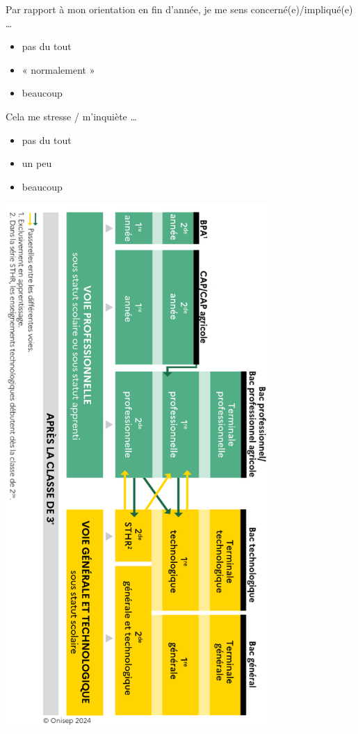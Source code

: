\documentclass[11pt,a5paper]{article}
\begin{document}
\vspace{1.2em}
Par rapport à mon orientation en fin d'année, je me sens concerné(e)/impliqué(e) …
\begin{itemize}[label=\square, topsep=0pt]
\item pas du tout
\item « normalement »
\item beaucoup
\end{itemize}


\vspace{1.2em}
Cela me stresse / m'inquiète …
\begin{itemize}[label=\square, topsep=0pt]
\item pas du tout
\item un peu
\item beaucoup
\end{itemize}

\newpage
\begin{center}
\includegraphics[width=0.75\textwidth]{images/orientation-apres-troisieme.png}
\end{center}
\end{document}
